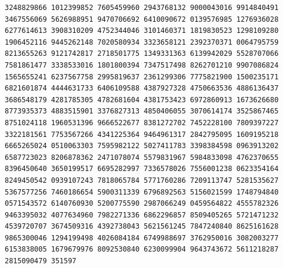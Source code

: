 \begin{Verbatim}[fontsize=\fontsize{6.4}{7.3}\selectfont]
3248829866 1012399852 7605459960 2943768132 9000043016 9914840491 3467556069 5626988951 9470706692 6410090672 0139576985 1276936028
6277614613 3908310209 4752344046 3101460371 1819830523 1298109280 1906452116 9445262148 7020580934 3323658121 2392370371 0064795759
8213655263 9121742817 2718501775 1349331363 6139942029 5528707066 7581861477 3338533016 1801800394 7347517498 8262701210 9907086824
1565655241 6237567758 2995819637 2361299306 7775821900 1500235171 6821601874 4444631733 6406109588 4387927328 4750663536 4886136437
3686548179 4281785305 4782681604 4381753423 6972860913 1673626680 8773935373 4883515901 3376827313 4850406055 3070614174 3525867465
8751024118 1960531396 9666522677 8381272702 7452228100 7809397227 3322181561 7753567266 4341225364 9464961317 2842795095 1609195218
6665265024 0510063303 7595982122 5027411783 3398384598 0963913202 6587723023 8206878362 2471078074 5579831967 5984833098 4762370655
8396450640 3650199517 6695282997 7336578026 7556001238 0623354164 8249450542 0939107243 7818065784 5771760286 7209113747 5281535627
5367577256 7460186654 5900311339 6796892563 5156021599 1748794840 0571543572 6140760930 5200775590 2987066249 0459564822 4555782326
9463395032 4077634960 7982271336 6862296857 8509405265 5721471232 4539720707 3674509316 4392738043 5621561245 7847240840 8625161628
9865300046 1294199498 4026084184 6749988697 3762950016 3082003277 6153838005 1679679976 8092530840 6230099904 9643743672 5611218287
2815090479 351597
\end{Verbatim}
